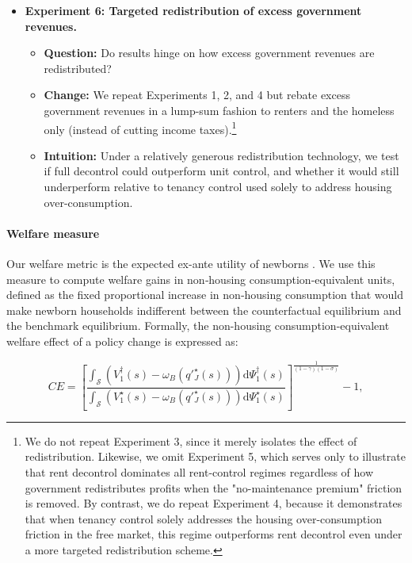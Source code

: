 \documentclass[parskip=full]{article}
\begin{document}
\begin{itemize}
  \item \textbf{Experiment 6: Targeted redistribution of excess government revenues.}
  \begin{itemize}
      \item \textbf{Question:} Do results hinge on how excess government revenues are redistributed?
      \item \textbf{Change:} We repeat Experiments 1, 2, and 4 but rebate excess government revenues in a lump-sum fashion to renters and the homeless only (instead of cutting income taxes).\footnote{We do not repeat Experiment 3, since it merely isolates the effect of redistribution. Likewise, we omit Experiment 5, which serves only to illustrate that rent decontrol dominates all rent-control regimes regardless of how government redistributes profits when the "no-maintenance premium" friction is removed. By contrast, we do repeat Experiment 4, because it demonstrates that when tenancy control solely addresses the housing over-consumption friction in the free market, this regime outperforms rent decontrol even under a more targeted redistribution scheme.}
      \item \textbf{Intuition:} Under a relatively generous redistribution technology, we test if full decontrol could outperform unit control, and whether it would still underperform relative to tenancy control used solely to address housing over-consumption.
  \end{itemize}

\end{itemize}

\paragraph{Welfare measure} Our welfare metric is the expected ex-ante utility of newborns \citep{ralws-1971,conesa-et-al,gkkoc}. We use this measure to compute welfare gains in non‑housing consumption‑equivalent units, defined as the fixed proportional increase in non‑housing consumption that would make newborn households indifferent between the counterfactual equilibrium and the benchmark equilibrium. Formally, the non-housing consumption-equivalent welfare effect of a policy change is expressed as:

\begin{equation}
  CE = \left[\frac{\int_{\mathcal{S}}\left(V^{\dagger}_{1}(s)-\omega_{B}\left(q'^{\star}_{J}(s)\right)\right)\mathrm{d}\Psi^{\dagger}_{1}(s)}{\int_{\mathcal{S}}\left(V^{\star}_{1}(s)-\omega_{B}\left(q'^{\star}_{J}(s)\right)\right)\mathrm{d}\Psi^{\star}_{1}(s)}\right]^{\frac{1}{(1-\gamma)(1-\sigma)}}-1,
\end{equation}
\end{document}
